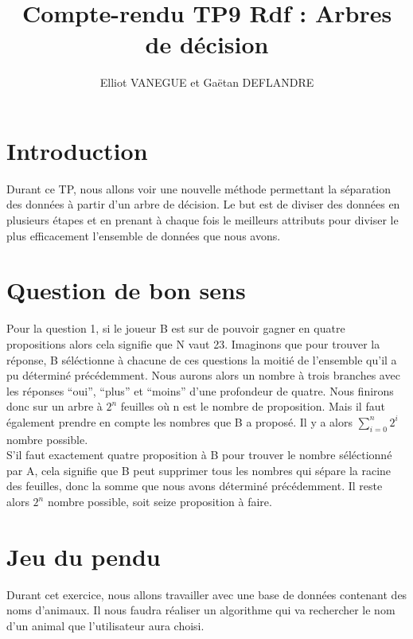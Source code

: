 \documentclass[a4paper,11pt]{article}
\title{Compte-rendu TP9 Rdf : Arbres de décision}
\author{Elliot VANEGUE et Gaëtan DEFLANDRE}
\begin{document}
  
  
  
  \maketitle
  
  \mbox{}
  \newpage
  \clearpage
  
  \section*{Introduction}
   Durant ce TP, nous allons voir une nouvelle méthode permettant la séparation des données à partir
   d'un arbre de décision. Le but est de diviser des données en plusieurs étapes et en prenant à chaque fois
   le meilleurs attributs pour diviser le plus efficacement l'ensemble de données que nous avons.

  \section{Question de bon sens}
  Pour la question 1, si le joueur B est sur de pouvoir gagner en quatre propositions alors cela signifie
  que N vaut 23. Imaginons que pour trouver la réponse, B séléctionne à chacune de ces questions la moitié
  de l'ensemble qu'il a pu déterminé précédemment. Nous aurons alors un nombre à trois branches avec les réponses
  \enquote{oui}, \enquote{plus} et \enquote{moins} d'une profondeur de quatre. Nous finirons donc sur un 
  arbre à $2^n$ feuilles où n est le nombre de proposition. Mais il faut également prendre en compte les nombres que B a proposé. Il y a alors
  $\sum_{i=0}^n 2^i$ nombre possible.\\
  
  S'il faut exactement quatre proposition à B pour trouver le nombre séléctionné par A, cela signifie que B peut 
  supprimer tous les nombres qui sépare la racine des feuilles, donc la somme que nous avons déterminé précédemment.
  Il reste alors $2^n$ nombre possible, soit seize proposition à faire.
  
  \section{Jeu du pendu}
  Durant cet exercice, nous allons travailler avec une base de données contenant des noms d'animaux. Il nous
  faudra réaliser un algorithme qui va rechercher le nom d'un animal que l'utilisateur aura choisi.\\
  
\end{document}
